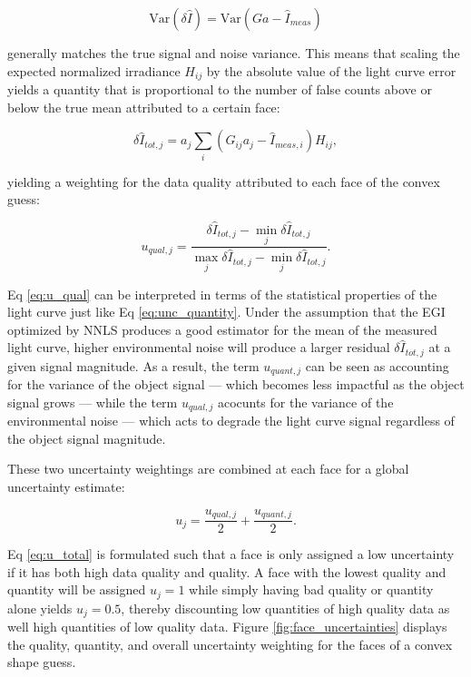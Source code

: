 \begin{equation}
  \mathrm{Var}\left(\delta \hat{I}\right) = \mathrm{Var}\left(Ga - \hat{I}_{meas}\right)
\end{equation}

generally matches the true signal and noise variance. This means that scaling the expected normalized irradiance $H_{ij}$ by the absolute value of the light curve error yields a quantity that is proportional to the number of false counts above or below the true mean attributed to a certain face:

\begin{equation}
  \delta \hat{I}_{tot,j} = a_j \sum_{i}{\left( G_{ij} a_j - \hat{I}_{meas,i} \right) H_{ij}},
\end{equation}

yielding a weighting for the data quality attributed to each face of the convex guess:

\begin{equation} \label{eq:u_qual}
  u_{qual,j} = \frac{\delta \hat{I}_{tot,j} - \min_{j}{\delta \hat{I}_{tot,j}}}{\max_{j}{\delta \hat{I}_{tot,j}} - \min_{j}{\delta \hat{I}_{tot,j}}}.
\end{equation}

Eq \ref{eq:u_qual} can be interpreted in terms of the statistical properties of the light curve just like Eq \ref{eq:unc_quantity}. Under the assumption that the EGI optimized by NNLS produces a good estimator for the mean of the measured light curve, higher environmental noise will produce a larger residual $\delta \hat{I}_{tot,j}$ at a given signal magnitude. As a result, the term $u_{quant,j}$ can be seen as accounting for the variance of the object signal --- which becomes less impactful as the object signal grows --- while the term $u_{qual,j}$ acocunts for the variance of the environmental noise --- which acts to degrade the light curve signal regardless of the object signal magnitude.

These two uncertainty weightings are combined at each face for a global uncertainty estimate:

\begin{equation} \label{eq:u_total}
  u_{j} = \frac{u_{qual,j}}{2} + \frac{u_{quant,j}}{2}.
\end{equation}

Eq \ref{eq:u_total} is formulated such that a face is only assigned a low uncertainty if it has both high data quality and quality. A face with the lowest quality and quantity will be assigned $u_{j} = 1$ while simply having bad quality or quantity alone yields $u_j = 0.5$, thereby discounting low quantities of high quality data as well high quantities of low quality data. Figure \ref{fig:face_uncertainties} displays the quality, quantity, and overall uncertainty weighting for the faces of a convex shape guess.

